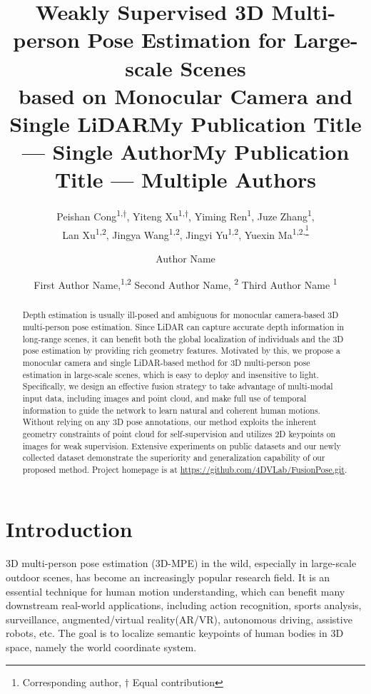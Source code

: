 \documentclass[letterpaper]{article} %
\title{Weakly Supervised 3D Multi-person Pose Estimation for Large-scale Scenes \\based on Monocular Camera and Single LiDAR}
\author{
   Peishan Cong\textsuperscript{\rm 1,$\dagger$},
   Yiteng Xu\textsuperscript{\rm 1,$\dagger$},
   Yiming Ren\textsuperscript{\rm 1},
   Juze Zhang\textsuperscript{\rm 1},\\
   Lan Xu\textsuperscript{\rm 1,2},
   Jingya Wang\textsuperscript{\rm 1,2},
   Jingyi Yu\textsuperscript{\rm 1,2},
   Yuexin Ma\textsuperscript{\rm 1,2,\footnote{Corresponding author, $\dagger$ Equal contribution}}
}
\title{My Publication Title --- Single Author}
\author {
    Author Name
}
\title{My Publication Title --- Multiple Authors}
\author {
    First Author Name,\textsuperscript{\rm 1,\rm 2}
    Second Author Name, \textsuperscript{\rm 2}
    Third Author Name \textsuperscript{\rm 1}
}
\begin{document}
\maketitle

\begin{abstract}

Depth estimation is usually ill-posed and ambiguous for monocular camera-based 3D multi-person pose estimation. Since LiDAR can capture accurate depth information in long-range scenes, it can benefit both the global localization of individuals and the 3D pose estimation by providing rich geometry features. Motivated by this, we propose a monocular camera and single LiDAR-based method for 3D multi-person pose estimation in large-scale scenes, which is easy to deploy and insensitive to light. Specifically, we design an effective fusion strategy to take advantage of multi-modal input data, including images and point cloud, and make full use of temporal information to guide the network to learn natural and coherent human motions. Without relying on any 3D pose annotations, our method exploits the inherent geometry constraints of point cloud for self-supervision and utilizes 2D keypoints on images for weak supervision. Extensive experiments on public datasets and our newly collected dataset demonstrate the superiority and generalization capability of our proposed method. Project homepage is at
\url{https://github.com/4DVLab/FusionPose.git}.
\end{abstract}

\section{Introduction}

3D multi-person pose estimation (3D-MPE) in the wild, especially in large-scale outdoor scenes, has become an increasingly popular research field. It is an essential technique for human motion understanding, which can benefit many downstream real-world applications, including action recognition, sports analysis, surveillance, augmented/virtual reality(AR/VR), autonomous driving, assistive robots, etc. The goal is to localize semantic keypoints of human bodies in 3D space, namely the world coordinate system.
\end{document}
